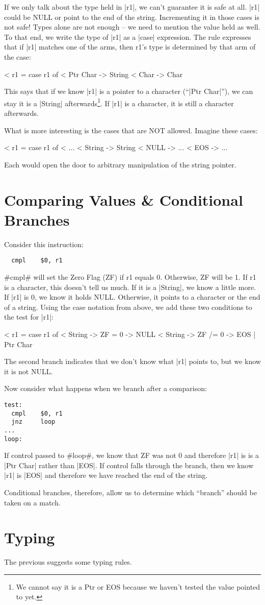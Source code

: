 \documentclass[11pt]{article}
\begin{document}
If we only talk about the type held in |r1|, we can't guarantee it is
safe at all. |r1| could be NULL or point to the end of the
string. Incrementing it in those cases is not safe! Types alone are
not enough -- we need to mention the value held as well. To that end,
we write the type of |r1| as a |case| expression. The rule expresses that
if |r1| matches one of the arms, then r1's type is determined by that
arm of the case:

< r1 = case r1 of 
<   Ptr Char -> String 
<   Char -> Char

This says that if we know |r1| is a pointer to a character (``|Ptr Char|''), we can stay it is a |String| afterwards\footnote{We cannot say it is a Ptr or EOS because we haven't tested the value pointed to yet.}. If |r1| is a character, it is still a character afterwards.

What is more interesting is the cases that are NOT allowed. Imagine these cases:

< r1 = case r1 of 
<   ...
<   String -> String
<   NULL -> ...
<   EOS -> ...

Each would open the door to arbitrary manipulation of the string pointer.

\section*{Comparing Values \& Conditional Branches}

Consider this instruction:

\begin{verbatim}
  cmpl    $0, r1
\end{verbatim}

#cmpl# will set the Zero Flag (ZF) if r1 equals 0. Otherwise, ZF will
be 1. If r1 is a character, this doesn't tell us much. If it is a
|String|, we know a little more. If |r1| is 0, we know it holds
NULL. Otherwise, it points to a character or the end of a string. Using
the case notation from above, we add these two conditions to the test
for |r1|:

< r1 = case r1 of
<   String -> ZF = 0 -> NULL
<   String -> ZF /= 0 -> {EOS | Ptr Char}

The second branch indicates that we don't know what |r1| points to,
but we know it is not NULL.

Now consider what happens when we branch after a comparison:

\begin{verbatim}
test:   
  cmpl    $0, r1
  jnz     loop
...
loop:   
\end{verbatim}

If control passed to #loop#, we know that ZF was not 0 and therefore
|r1| is is a |Ptr Char| rather than |EOS|. If control falls through the
branch, then we know |r1| is |EOS| and therefore we have reached
the end of the string. 

Conditional branches, therefore, allow us to determine which ``branch'' should
be taken on a match. 

\section*{Typing}

The previous suggests some typing rules. 
\end{document}
